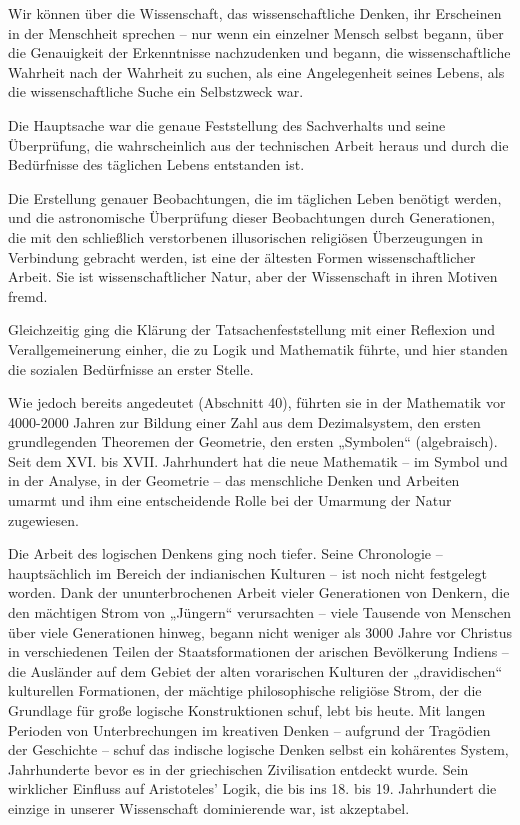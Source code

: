 \documentclass[11pt,a4paper]{book}
\begin{document}
Wir können über die Wissenschaft, das wissenschaftliche Denken, ihr Erscheinen in der Menschheit sprechen -- nur wenn ein einzelner Mensch selbst begann, über die Genauigkeit der Erkenntnisse nachzudenken und begann, die wissenschaftliche Wahrheit nach der Wahrheit zu suchen, als eine Angelegenheit seines Lebens, als die wissenschaftliche Suche ein Selbstzweck war. 

Die Hauptsache war die genaue Feststellung des Sachverhalts und seine Überprüfung, die wahrscheinlich aus der technischen Arbeit heraus und durch die Bedürfnisse des täglichen Lebens entstanden ist. 

Die Erstellung genauer Beobachtungen, die im täglichen Leben benötigt werden, und die astronomische Überprüfung dieser Beobachtungen durch Generationen, die mit den schließlich verstorbenen illusorischen religiösen Überzeugungen in Verbindung gebracht werden, ist eine der ältesten Formen wissenschaftlicher Arbeit. Sie ist wissenschaftlicher Natur, aber der Wissenschaft in ihren Motiven fremd. 

Gleichzeitig ging die Klärung der Tatsachenfeststellung mit einer Reflexion und Verallgemeinerung einher, die zu Logik und Mathematik führte, und hier standen die sozialen Bedürfnisse an erster Stelle. 

Wie jedoch bereits angedeutet (Abschnitt 40), führten sie in der Mathematik vor 4000-2000 Jahren zur Bildung einer Zahl aus dem Dezimalsystem, den ersten grundlegenden Theoremen der Geometrie, den ersten „Symbolen“ (algebraisch). Seit dem XVI. bis XVII. Jahrhundert hat die neue Mathematik -- im Symbol und in der Analyse, in der Geometrie -- das menschliche Denken und Arbeiten umarmt und ihm eine entscheidende Rolle bei der Umarmung der Natur zugewiesen. 

Die Arbeit des logischen Denkens ging noch tiefer. Seine Chronologie -- hauptsächlich im Bereich der indianischen Kulturen -- ist noch nicht festgelegt worden. Dank der ununterbrochenen Arbeit vieler Generationen von Denkern, die den mächtigen Strom von „Jüngern“ verursachten -- viele Tausende von Menschen über viele Generationen hinweg, begann nicht weniger als 3000 Jahre vor Christus in verschiedenen Teilen der Staatsformationen der arischen Bevölkerung Indiens -- die Ausländer auf dem Gebiet der alten vorarischen Kulturen der „dravidischen“ kulturellen Formationen, der mächtige philosophische religiöse Strom, der die Grundlage für große logische Konstruktionen schuf, lebt bis heute. Mit langen Perioden von Unterbrechungen im kreativen Denken -- aufgrund der Tragödien der Geschichte -- schuf das indische logische Denken selbst ein kohärentes System, Jahrhunderte bevor es in der griechischen Zivilisation entdeckt wurde. Sein wirklicher Einfluss auf Aristoteles' Logik, die bis ins 18. bis 19. Jahrhundert die einzige in unserer Wissenschaft dominierende war, ist akzeptabel. 
\end{document}
